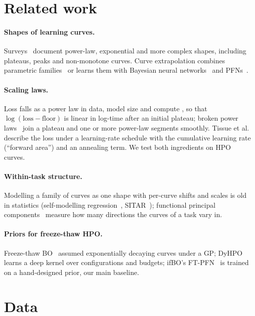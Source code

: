 \documentclass[10pt]{article}
\begin{document}
\section{Related work}

\paragraph{Shapes of learning curves.} Surveys~\cite{viering2022shape,mohr2022learning} document power-law,
exponential and more complex shapes, including plateaus, peaks and non-monotone curves. Curve extrapolation
combines parametric families~\cite{domhan2015speeding} or learns them with Bayesian neural
networks~\cite{klein2017learning} and PFNs~\cite{adriaensen2023efficient}.
\paragraph{Scaling laws.} Loss falls as a power law in data, model size and compute
\cite{hestness2017deep,kaplan2020scaling}, so that $\log(\text{loss} - \text{floor})$ is linear in log-time
after an initial plateau; broken power laws~\cite{caballero2023broken} join a plateau and one or more power-law
segments smoothly. Tissue et al.~\cite{tissue2024scaling} describe the loss under a learning-rate schedule with the
cumulative learning rate (``forward area'') and an annealing term. We test both ingredients on HPO curves.
\paragraph{Within-task structure.} Modelling a family of curves as one shape with per-curve shifts and scales is
old in statistics (self-modelling regression~\cite{lawton1972self}, SITAR~\cite{cole2010sitar}); functional
principal components~\cite{ramsay2005functional} measure how many directions the curves of a task vary in.
\paragraph{Priors for freeze-thaw HPO.} Freeze-thaw BO~\cite{swersky2014freeze} assumed exponentially decaying
curves under a GP; DyHPO~\cite{wistuba2022supervising} learns a deep kernel over configurations and budgets; ifBO's
FT-PFN~\cite{rakotoarison2024incontext} is trained on a hand-designed prior, our main baseline.

\section{Data}
\label{sec:data}
\end{document}
